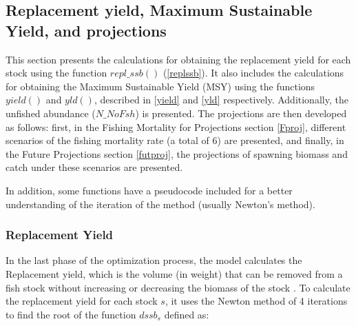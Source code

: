 \documentclass{article}
\begin{document}






\subsection{Replacement yield, Maximum Sustainable Yield, and projections}


This section presents the calculations for obtaining the replacement yield for each stock using the function $repl\_ssb()$ (\ref{replssb}). It also includes the calculations for obtaining the Maximum Sustainable Yield (MSY) using the functions $yield()$ and $yld()$, described in \ref{yield} and \ref{yld} respectively. Additionally, the unfished abundance ($N\_NoFsh$) is presented. The projections are then developed as follows: first, in the Fishing Mortality for Projections section \ref{Fproj}, different scenarios of the fishing mortality rate (a total of 6) are presented, and finally, in the Future Projections section \ref{futproj}, the projections of spawning biomass and catch under these scenarios are presented.




In addition, some functions have a pseudocode included for a better understanding of the iteration of the method (usually Newton's method).
\subsubsection{Replacement Yield}
In the last phase of the optimization process, the model calculates the Replacement yield, which is the volume (in weight) that can be removed from a fish stock without increasing or decreasing the biomass of the stock \cite{glosario}.
To calculate the replacement yield for each stock  $s$, it uses the Newton method of 4 iterations to find the root of the function $dssb_{s}$ defined as: 
\end{document}
